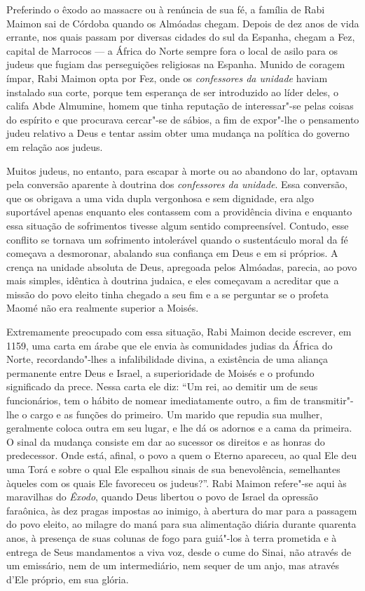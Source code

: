 Preferindo o êxodo ao massacre ou à renúncia de sua fé, a família de
Rabi Maimon sai de Córdoba quando os Almóadas chegam. Depois de dez
anos de vida errante, nos quais passam por diversas cidades do sul da
Espanha, chegam a Fez, capital de Marrocos --- a África do Norte
sempre fora o local de asilo para os judeus que fugiam das perseguições
religiosas na Espanha. Munido de coragem ímpar, Rabi Maimon opta por
Fez, onde os \emph{confessores da unidade} haviam instalado sua corte,
porque tem esperança de ser introduzido ao líder deles, o califa
Abde Almumine, homem que tinha reputação de interessar"-se pelas coisas 
do espírito e que procurava cercar"-se de sábios, a fim de expor"-lhe o 
pensamento judeu relativo a Deus e tentar assim obter uma mudança na 
política do governo em relação aos judeus.

Muitos judeus, no entanto, para escapar à morte ou ao abandono do lar,
optavam pela conversão aparente à doutrina dos \emph{confessores da
unidade}. Essa conversão, que os obrigava a uma vida dupla vergonhosa
e sem dignidade, era algo suportável apenas enquanto eles contassem com
a providência divina e enquanto essa situação de sofrimentos tivesse
algum sentido compreensível. Contudo, esse conflito se tornava um
sofrimento intolerável quando o sustentáculo moral da fé começava a
desmoronar, abalando sua confiança em Deus e em si próprios. A crença na
unidade absoluta de Deus, apregoada pelos Almóadas, parecia, ao povo
mais simples, idêntica à doutrina judaica, e eles começavam a acreditar
que a missão do povo eleito tinha chegado a seu fim e a se perguntar se
o profeta Maomé não era realmente superior a Moisés.

Extremamente preocupado com essa situação, Rabi Maimon decide escrever,
em 1159, uma carta em árabe que ele envia às comunidades judias da
África do Norte, recordando"-lhes a infalibilidade divina, a existência
de uma aliança permanente entre Deus e Israel, a superioridade de Moisés
e o profundo significado da prece. Nessa carta ele diz: ``Um rei, ao
demitir um de seus funcionários, tem o hábito de nomear imediatamente
outro, a fim de transmitir"-lhe o cargo e as funções do primeiro. Um
marido que repudia sua mulher, geralmente coloca outra em seu lugar, e
lhe dá os adornos e a cama da primeira. O sinal da mudança consiste em
dar ao sucessor os direitos e as honras do predecessor. Onde está,
afinal, o povo a quem o Eterno apareceu, ao qual Ele deu uma
Torá e sobre o qual Ele espalhou sinais de sua benevolência,
semelhantes àqueles com os quais Ele favoreceu os judeus?''. Rabi
Maimon refere"-se aqui às maravilhas do \emph{Êxodo}, quando Deus libertou o
povo de Israel da opressão faraônica, às dez pragas impostas ao inimigo,
à abertura do mar para a passagem do povo eleito, ao milagre do maná
para sua alimentação diária durante quarenta anos, à presença de suas
colunas de fogo para guiá"-los à terra prometida e à entrega de Seus
mandamentos a viva voz, desde o cume do Sinai, não através de um
emissário, nem de um intermediário, nem sequer de um anjo, mas através
d'Ele próprio, em sua glória. 

